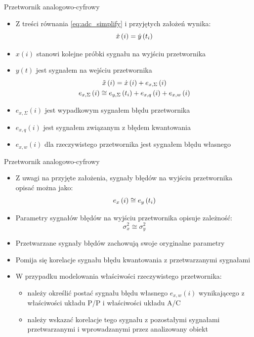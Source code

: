 \documentclass[12pt, polish, aspectratio = 169]{beamer}
\begin{document}
\begin{frame}{Przetwornik analogowo-cyfrowy}
\begin{itemize}
\item Z treści równania \eqref{eq:adc_simplify} i przyjętych założeń wynika:
\begin{equation}
\dot{x} \left(i\right) = \dot{y} \left(t_{i}\right) \label{eq:adc_out_ideal}
\end{equation}
\item $x(i)$ stanowi kolejne próbki sygnału na wyjściu przetwornika
\item $y(t)$ jest sygnałem na wejściu przetwornika
\begin{gather}
\tilde{x} \left(i\right) = \dot{x} \left(i\right) + e_{x,\Sigma} \left(i\right) \label{eq:adc_out_real} \\
e_{x,\Sigma} \left(i\right) \cong e_{y,\Sigma} \left(t_{i}\right) + e_{x,q} \left(i\right) + e_{x,w} \left(i\right) \label{eq:adc_out_error}
\end{gather}
\item $e_{x,\Sigma}(i)$ jest wypadkowym sygnałem błędu przetwornika
\item $e_{x,q}(i)$ jest sygnałem związanym z błędem kwantowania
\item $e_{x,w}(i)$ dla rzeczywistego przetwornika jest sygnałem błędu własnego
\end{itemize}
\end{frame}

\begin{frame}{Przetwornik analogowo-cyfrowy}
\begin{itemize}
\item Z uwagi na przyjęte założenia, sygnały błędów na wyjściu przetwornika opisać można jako:
\begin{equation}
e_{x} \left(i\right) \cong e_{y} \left(t_{i}\right) \label{eq:adc_errout}
\end{equation}
\item Parametry sygnałów błędów na wyjściu przetwornika opisuje zależność:
\begin{equation}
\sigma_{x}^{2} \cong \sigma_{y}^{2} \label{eq:adc_varout}
\end{equation}
\item Przetwarzane sygnały błędów zachowują swoje oryginalne parametry
\item Pomija się korelacje sygnału błędu kwantowania z przetwarzanymi sygnałami
\item W przypadku modelowania właściwości rzeczywistego przetwornika:
	\begin{itemize}
	\item należy określić postać sygnału błędu własnego $e_{x,w}(i)$ wynikającego z właściwości układu P/P i właściwości układu A/C
	\item należy wskazać korelacje tego sygnału z pozostałymi sygnałami przetwarzanymi i wprowadzanymi przez analizowany obiekt
	\end{itemize}
\end{itemize}
\end{frame}
\end{document}
